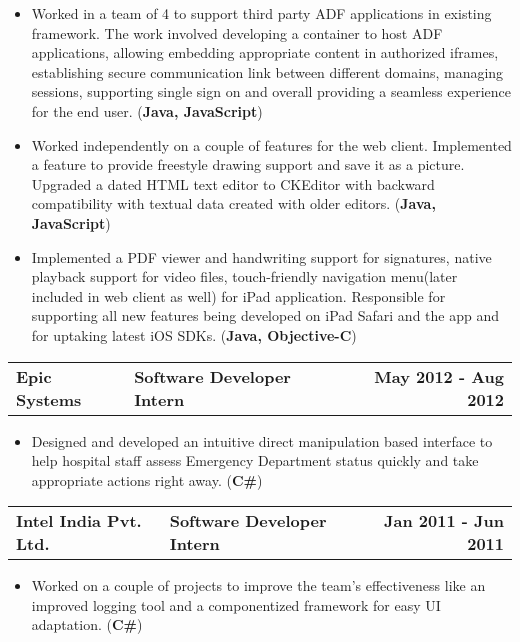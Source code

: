 \documentclass[a4paper]{article}
\makeatletter
\newcommand{\experiencesubsection}[3]{
	\begin{tabular*}{1.0\textwidth}{@{\extracolsep{\fill}} p{7cm} l r}
		\textbf{#1} & \textbf{#2} & \textbf{#3}
	\end{tabular*}
} %
\newcommand{\techitem}[1]{\item Technology: \textbf{#1}} %
\newcommand{\customitemizespacing}{\addtolength{\itemsep}{-0.5\baselineskip}}
\makeatother
\begin{document}
\begin{itemize}
	\item Worked in a team of 4 to support third party ADF applications in existing framework. The work involved developing a container to host ADF applications, allowing embedding appropriate content in authorized iframes, establishing secure communication link between different domains, managing sessions, supporting single sign on and overall providing a seamless experience for the end user. (\textbf{Java, JavaScript})
	\item Worked independently on a couple of features for the web client. Implemented a feature to provide freestyle drawing support and save it as a picture. Upgraded a dated HTML text editor to CKEditor with backward compatibility with textual data created with older editors. (\textbf{Java, JavaScript})
	\item Implemented a PDF viewer and handwriting support for signatures, native playback support for video files, touch-friendly navigation menu(later included in web client as well) for iPad application. Responsible for supporting all new features being developed on iPad Safari and the app and for uptaking latest iOS SDKs. (\textbf{Java, Objective-C})
\end{itemize}

\experiencesubsection{Epic Systems}{Software Developer Intern}{May 2012 - Aug 2012}
\begin{itemize}
	\item Designed and developed an intuitive direct manipulation based interface to help hospital staff assess Emergency Department status quickly and take appropriate actions right away. (\textbf{C\#})
\end{itemize}

\experiencesubsection{Intel India Pvt. Ltd.}{Software Developer Intern}{Jan 2011 - Jun 2011}
\begin{itemize}
	\item Worked on a couple of projects to improve the team's effectiveness like an improved logging tool and a componentized framework for easy UI adaptation. (\textbf{C\#})
\end{itemize}
\end{document}
